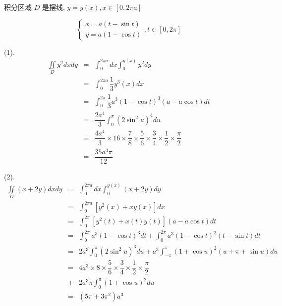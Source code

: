 \begin{solution}
	
	积分区域 $D$ 是摆线, $y = y(x), x\in [0,2\pi a]$
	
	$$\begin{cases}
	  x = a(t-\sin t)\\
	  y = a(1-\cos t)
	\end{cases}, t\in [0,2\pi]$$
	
	(1). 
	\begin{eqnarray*}
		\iint\limits_{D}y^2dxdy & = & \int_{0}^{2\pi a}dx\int_{0}^{y(x)}y^2dy\\
		& = & \int_{0}^{2\pi a}\dfrac{1}{3}y^{3}(x)dx\\
		& = & \int_{0}^{2\pi }\dfrac{1}{3}a^3(1-\cos t)^3(a-a\cos t)dt\\
		& = & \dfrac{2a^{4}}{3}\int_{0}^{\pi}(2\sin^2 u)^4du\\
		& = & \dfrac{4a^{4}}{3}\times 16\times \dfrac{7}{8}\times\dfrac{5}{6}\times\dfrac{3}{4}\times\dfrac{1}{2}\times\dfrac{\pi}{2}\\
		& = & \dfrac{35a^{4}\pi}{12}
	\end{eqnarray*}
	
	(2).
	\begin{eqnarray*}
		\iint\limits_{D}(x+2y)dxdy & = & \int_{0}^{2\pi a}dx\int_{0}^{y(x)}(x+2y)dy\\
		& = & \int_{0}^{2\pi a}\left[y^{2}(x)+xy(x)\right]dx\\
		& = & \int_{0}^{2\pi }\left[y^{2}(t)+x(t)y(t)\right](a-a\cos t)dt\\
		& = & \int_{0}^{2\pi}a^{3}(1-\cos t)^{3}dt + \int_{0}^{2\pi}a^{3}(1-\cos t)^{2}(t-\sin t)dt\\
		& = & 2a^{3}\int_{0}^{\pi}(2\sin^{2} u)^{3}du + a^{3}\int_{-\pi}^{\pi}(1+\cos u)^{2}(u + \pi + \sin u)du\\
		& = & 4a^{3}\times 8\times \dfrac{5}{6}\times\dfrac{3}{4}\times\dfrac{1}{2}\times\dfrac{\pi}{2}\\
		& + & 2a^{3}\pi \int_{0}^{\pi} (1+\cos u)^{2}du\\
		& = & (5\pi + 3\pi^{2})a^{3}
	\end{eqnarray*}
\end{solution}


